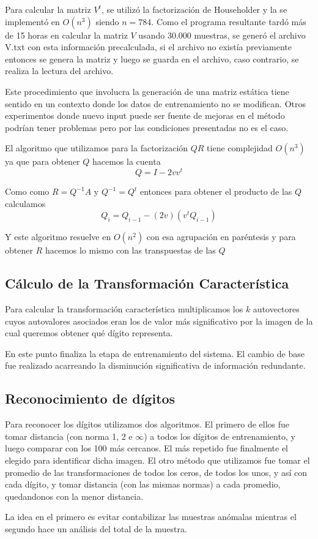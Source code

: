 Para calcular la matriz $V^t$, se utiliz\'o la factorizaci\'on de Householder y la se implement\'o en $O(n^3)$
siendo $n = 784$. Como el programa resultante tard\'o m\'as de 15 horas en calcular la matriz $V$ usando 30.000 muestras,
se gener\'o el archivo V.txt con esta informaci\'on precalculada, si el archivo no exist\'ia previamente
entonces se genera la matriz y luego se guarda en el archivo, caso contrario, se realiza la lectura del archivo.

Este procedimiento que involucra la generaci\'on de una matriz est\'atica tiene sentido en un contexto
donde los datos de entrenamiento no se modifican. Otros experimentos donde nuevo input puede ser fuente de mejoras
en el m\'etodo podr\'ian tener problemas pero por las condiciones presentadas no es el caso.

El algoritmo que utilizamos para la factorizaci\'on $QR$ tiene complejidad $O(n^3)$ ya que para obtener $Q$ hacemos la cuenta
$$Q = I - 2vv^t$$

Como como $R = Q^{-1}A$ y $Q^{-1} = Q^t$ entonces para obtener el producto de
las $Q$ calculamos
$$Q_i = Q_{i-1} - (2v)(v^t Q_{i-1})$$

Y este algoritmo resuelve en $O(n^2)$ con esa agrupaci\'on en par\'entesis y para 
obtener $R$ hacemos lo mismo con las transpuestas de las $Q$

\subsection{C\'alculo de la Transformaci\'on Caracter\'istica}

Para calcular la transformaci\'on caracter\'istica multiplicamos los $k$
autovectores cuyos autovalores asociados eran los de valor m\'as significativo
por la imagen de la cual queremos obtener qu\'e d\'igito representa.

En este punto finaliza la etapa de entrenamiento del sistema. El cambio de base
fue realizado acarreando la disminuci\'on significativa de informaci\'on
redundante.

\subsection{Reconocimiento de d\'igitos}
Para reconocer los d\'igitos utilizamos dos algoritmos. El primero de ellos fue tomar distancia (con norma 1, 2 e $\infty$) a
todos los d\'igitos de entrenamiento, y luego comparar con los 100 m\'as cercanos. El m\'as repetido fue finalmente
el elegido para identificar dicha imagen. El otro m\'etodo que utilizamos fue tomar el promedio de las transformaciones
de todos los ceros, de todos los unos, y as\'i con cada d\'igito, y tomar distancia (con las mismas normas)
a cada promedio, quedandonos con la menor distancia.

La idea en el primero es evitar contabilizar las muestras an\'omalas mientras el
segundo hace un an\'alisis del total de la muestra.
